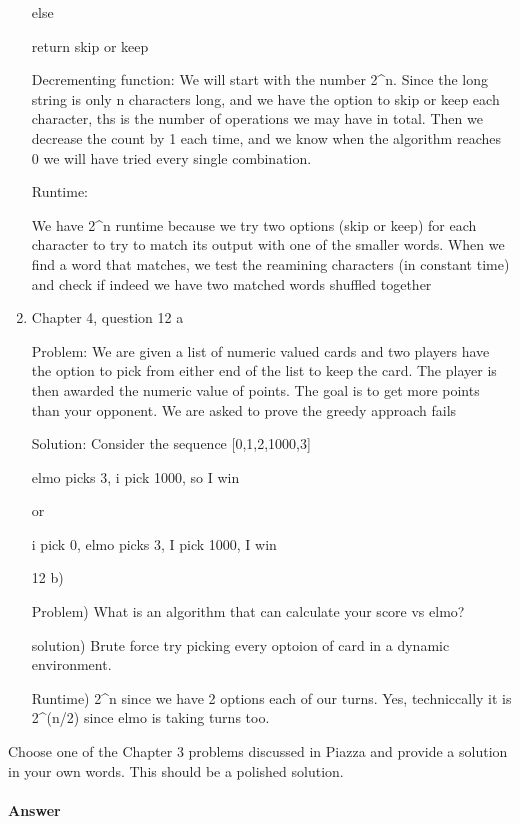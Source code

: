 \documentclass{article}
\begin{document}
\begin{enumerate}
    else

    return skip or keep

Decrementing function: We will start with the number 2^n. Since the long string is only n characters long, and we have the option to skip or keep each character, ths is the number of operations we may have in total. Then we decrease the count by 1 each time, and we know when the algorithm reaches 0 we will have tried every single combination.

Runtime:

We have 2^n runtime because we try two options (skip or keep) for each character to try to match its output with one of the smaller words. When we find a word that matches, we test the reamining characters (in constant time) and check if indeed we have two matched words shuffled together
\item Chapter 4, question 12 a

Problem: We are given a list of numeric valued cards and two players have the option to pick from either end of the list to keep the card. The player is then awarded the numeric value of points. The goal is to get more points than your opponent. We are asked to prove the greedy approach fails

Solution: Consider the sequence [0,1,2,1000,3]

elmo picks 3, i pick 1000, so I win

or

i pick 0, elmo picks 3, I pick 1000, I win

12 b)

Problem) What is an algorithm that can calculate your score vs elmo?

solution) Brute force try picking every optoion of card in a dynamic environment.

Runtime) 2^n since we have 2 options each of our turns. Yes, techniccally it is 2^(n/2) since elmo is taking turns too.

\end{enumerate}


\nextprob
{}

Choose one of the Chapter 3 problems discussed in Piazza and provide a solution
in your own words.  This should be a polished solution.

\paragraph{Answer}
\end{document}
